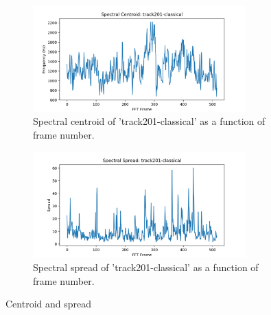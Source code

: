\documentclass[11pt,a4paper]{article}
\begin{document}
\begin{figure}[tb]
	\centering
	\begin{subfigure}[t]{\hsize}
		\centering
		\includegraphics[width=0.9\textwidth]{centroid_track201-classical}
		\caption{Spectral centroid of 'track201-classical' as a function of frame number.}
		\label{fig:centroid_classical}
	\end{subfigure}
	\begin{subfigure}[t]{\hsize}
		\centering
		\includegraphics[width=0.9\textwidth]{spread_track201-classical}
		\caption{Spectral spread of 'track201-classical' as a function of frame number.}
		\label{fig:spread_classical}
	\end{subfigure}
	\caption{Centroid and spread \label{fig:cs}}
\end{figure}
\clearpage
\end{document}
